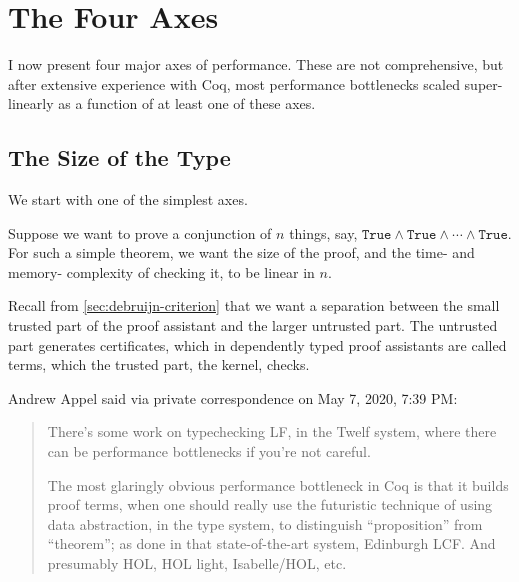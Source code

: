 \section{The Four Axes}\label{sec:perf-axes}
I now present four major axes of performance.
These are not comprehensive, but after extensive experience with Coq, most performance bottlenecks scaled super-linearly as a function of at least one of these axes.

\subsection{The Size of the Type} \label{sec:perf-axis:size-of-type}  \label{sec:quadratic-conj-certificate}

We start with one of the simplest axes.

Suppose we want to prove a conjunction of $n$ things, say, $\texttt{True} \wedge \texttt{True} \wedge \cdots \wedge \texttt{True}$.
For such a simple theorem, we want the size of the proof, and the time- and memory- complexity of checking it, to be linear in $n$.

Recall from \autoref{sec:debruijn-criterion} that we want a separation between the small trusted part of the proof assistant and the larger untrusted part.
The untrusted part generates certificates, which in dependently typed proof assistants are called terms, which the trusted part, the kernel, checks.

\begin{minorcomment}
Andrew Appel said via private correspondence on May 7, 2020, 7:39 PM:
\begin{quotation}
There's some work on typechecking LF, in the Twelf system, where there can be performance bottlenecks if you're not careful.

The most glaringly obvious performance bottleneck in Coq is that it builds proof terms, when one should really use the futuristic technique of using data abstraction, in the type system, to distinguish ``proposition'' from ``theorem''; as done in that state-of-the-art system, Edinburgh LCF.  And presumably HOL, HOL light, Isabelle/HOL, etc.
\end{quotation}
\end{minorcomment}

